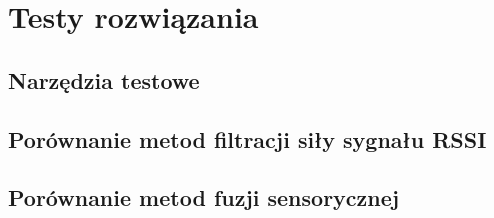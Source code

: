 \chapter{Testy rozwiązania} 
\label{ch:testy}



\section{Narzędzia testowe}

\section{Porównanie metod filtracji siły sygnału RSSI}

\section{Porównanie metod fuzji sensorycznej}


